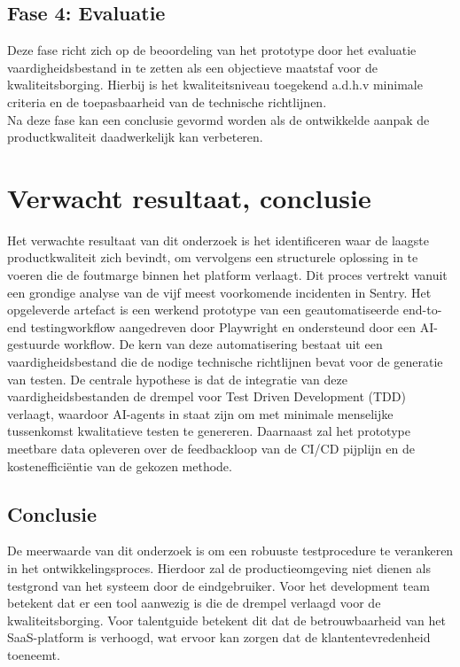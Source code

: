 \subsection{Fase 4: Evaluatie}

Deze fase richt zich op de beoordeling van het prototype door het evaluatie vaardigheidsbestand in te zetten als een objectieve maatstaf voor de kwaliteitsborging. Hierbij is het kwaliteitsniveau toegekend a.d.h.v minimale criteria en de toepasbaarheid van de technische richtlijnen.
\bigskip
\\
Na deze fase kan een conclusie gevormd worden als de ontwikkelde aanpak de productkwaliteit daadwerkelijk kan verbeteren.

\section{Verwacht resultaat, conclusie}%
\label{sec:verwachte_resultaten}

Het verwachte resultaat van dit onderzoek is het identificeren waar de laagste productkwaliteit zich bevindt, om vervolgens een structurele oplossing in te voeren die de foutmarge binnen het platform verlaagt. Dit proces vertrekt vanuit een grondige analyse van de vijf meest voorkomende incidenten in Sentry. Het opgeleverde artefact is een werkend prototype van een geautomatiseerde end-to-end testingworkflow aangedreven door Playwright en ondersteund door een AI-gestuurde workflow. De kern van deze automatisering bestaat uit een vaardigheidsbestand die de nodige technische richtlijnen bevat voor de generatie van testen.
De centrale hypothese is dat de integratie van deze vaardigheidsbestanden de drempel voor Test Driven Development (TDD) verlaagt, waardoor AI-agents in staat zijn om met minimale menselijke tussenkomst kwalitatieve testen te genereren. Daarnaast zal het prototype meetbare data opleveren over de feedbackloop van de CI/CD pijplijn en de kostenefficiëntie van de gekozen methode.

\subsection{Conclusie}

De meerwaarde van dit onderzoek is om een robuuste testprocedure te verankeren in het ontwikkelingsproces. Hierdoor zal de productieomgeving niet dienen als testgrond van het systeem door de eindgebruiker. Voor het development team betekent dat er een tool aanwezig is die de drempel verlaagd voor de kwaliteitsborging. Voor talentguide betekent dit dat de betrouwbaarheid van het SaaS-platform is verhoogd, wat ervoor kan zorgen dat de klantentevredenheid toeneemt.



